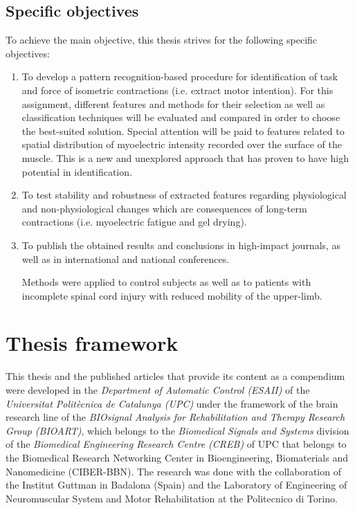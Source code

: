         
        \subsection*{Specific objectives}
        
To achieve the main objective, this thesis strives for the following specific objectives:

\begin{enumerate}[I]

\item To develop a pattern recognition-based procedure for identification of task and force of isometric contractions (i.e. extract motor intention). For this assignment, different features and methods for their selection as well as classification techniques will be evaluated and compared in order to choose the best-suited solution. Special attention will be paid to features related to spatial distribution of myoelectric intensity recorded over the surface of the muscle. This is a new and unexplored approach that has proven to have high potential in identification. 

\item To test stability and robustness of extracted features regarding physiological and non-physiological changes which are consequences of long-term contractions (i.e. myoelectric fatigue and gel drying).

\item To publish the obtained results and conclusions in high-impact journals, as well as in international and national conferences.

Methods  were applied to control subjects as well as to patients with incomplete spinal cord injury with reduced mobility of the upper-limb.

\end{enumerate}

     \section{Thesis framework}
     
This thesis and the published articles that provide its content as a compendium were developed in the \emph{Department of Automatic Control (ESAII)} of the \emph{Universitat Polit\`{e}cnica de Catalunya (UPC)} under the framework of the brain research line of the \emph{BIOsignal Analysis for Rehabilitation and Therapy Research Group (BIOART)}, which belongs to the \emph{Biomedical Signals and Systems} division of the \emph{Biomedical Engineering Research Centre (CREB)} of UPC that belongs to the Biomedical Research Networking Center in Bioengineering, Biomaterials and Nanomedicine (CIBER-BBN). The research was done with the collaboration of the Institut Guttman in Badalona (Spain) and the Laboratory of Engineering of Neuromuscular System and Motor Rehabilitation at the Politecnico di Torino.


